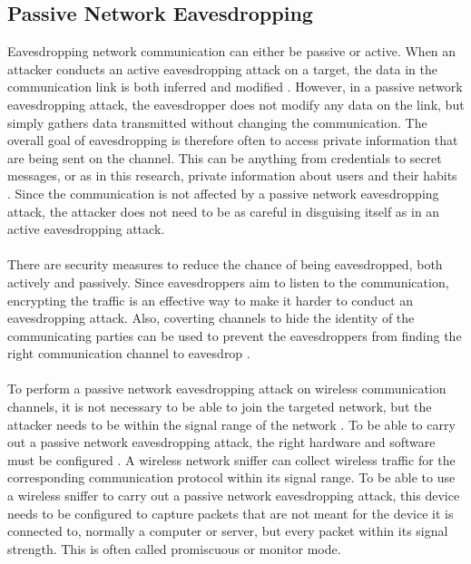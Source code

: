 \subsection{Passive Network Eavesdropping}
Eavesdropping network communication can either be passive or active. When an attacker conducts an active eavesdropping attack on a target, the data in the communication link is both inferred and modified \cite{Eavesdropping}. However, in a passive network eavesdropping attack, the eavesdropper does not modify any data on the link, but simply gathers data transmitted without changing the communication. The overall goal of eavesdropping is therefore often to access private information that are being sent on the channel. This can be anything from credentials to secret messages, or as in this research, private information about users and their habits \cite{Eavesdropping}. Since the communication is not affected by a passive network eavesdropping attack, the attacker does not need to be as careful in disguising itself as in an active eavesdropping attack.  
\\\\
There are security measures to reduce the chance of being eavesdropped, both actively and passively. Since eavesdroppers aim to listen to the communication, encrypting the traffic is an effective way to make it harder to conduct an eavesdropping attack. Also, coverting channels to hide the identity of the communicating parties can be used to prevent the eavesdroppers from finding the right communication channel to eavesdrop \cite{Eavesdropping}.
\\\\
To perform a passive network eavesdropping attack on wireless communication channels, it is not necessary to be able to join the targeted network, but the attacker needs to be within the signal range of the network \cite{WifiEavesdropEnc}. To be able to carry out a passive network eavesdropping attack, the right hardware and software must be configured \cite{Sniffingtech}. A wireless network sniffer can collect wireless traffic for the corresponding communication protocol within its signal range. To be able to use a wireless sniffer to carry out a passive network eavesdropping attack, this device needs to be configured to capture packets that are not meant for the device it is connected to, normally a computer or server, but every packet within its signal strength. This is often called promiscuous or monitor mode. 
\\\\
